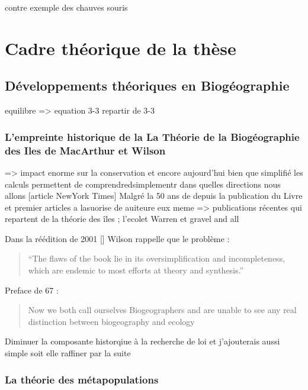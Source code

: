 contre exemple des chauves souris

\section{Cadre théorique de la
thèse}\label{cadre-thuxe9orique-de-la-thuxe8se}

\subsection{Développements théoriques en
Biogéographie}\label{duxe9veloppements-thuxe9oriques-en-bioguxe9ographie}

equilibre =\textgreater{} equation 3-3 repartir de 3-3

\subsubsection{L'empreinte historique de la La Théorie de la
Biogéographie des Iles de MacArthur et
Wilson}\label{lempreinte-historique-de-la-la-thuxe9orie-de-la-bioguxe9ographie-des-iles-de-macarthur-et-wilson}

=\textgreater{} impact enorme sur la conservation et encore aujourd'hui
bien que simplifié les calculs permettent de comprendredsimplementr dans
quelles directions nous allons {[}article NewYork Times{]} Malgré la 50
ans de depuis la publication du Livre et premier articles a lasuorise de
auiteure eux meme =\textgreater{} publications récentes qui repartent de
la théorie des îles ; l'ecolet Warren et gravel and all

Dans la réédition de 2001 {[}{]} Wilson rappelle que le problème :

\begin{quote}
``The flaws of the book lie in its oversimplification and
incompleteness, which are endemic to most efforts at theory and
synthesis.''
\end{quote}

Preface de 67 :

\begin{quote}
Now we both call ourselves Biogeographers and are unable to see any real
distinction between biogeography and ecology
\end{quote}

Diminuer la composante historqiue à la recherche de loi et j'ajouterais
aussi simple soit elle raffiner par la suite

\subsubsection{La théorie des
métapopulations}\label{la-thuxe9orie-des-muxe9tapopulations}


